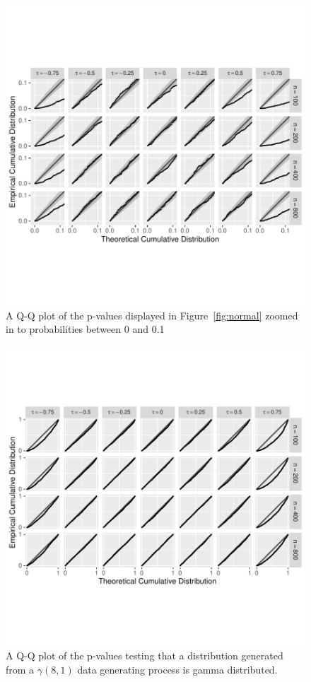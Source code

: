 \documentclass[12pt, titlepage, letterpaper]{article}
\begin{document}
{\begin{figure}[tbp]
  \centering
  \includegraphics[width = \textwidth]{figures/zoom_normal}
  \caption{A Q-Q plot of the p-values displayed in Figure~\ref{fig:normal} zoomed in to 
  probabilities between 0 and
  0.1}
  \label{fig:zoom_normal}
\end{figure}

\begin{figure}[tbp]
  \centering
  \includegraphics[scale=1]{figures/gamma}
  \caption{A Q-Q plot of the p-values testing that a distribution
  generated from a $\gamma(8,1)$ data generating process is gamma distributed.}
  \label{fig:gamma}
\end{figure}

}
\end{document}

